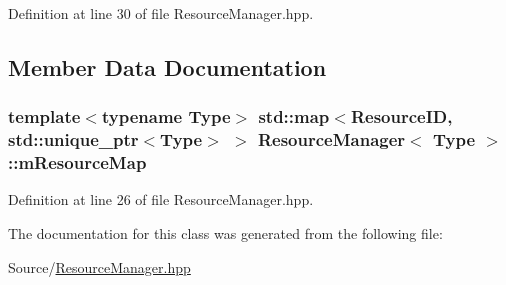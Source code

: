 Definition at line 30 of file Resource\-Manager.\-hpp.



\subsection{Member Data Documentation}
\hypertarget{class_resource_manager_af7f7accf221f620d9816ad3cfb80674e}{
\subsubsection[{m\-Resource\-Map}]{\setlength{\rightskip}{0pt plus 5cm}template$<$typename Type$>$ std\-::map$<${\bf Resource\-I\-D}, std\-::unique\-\_\-ptr$<$Type$>$ $>$ {\bf Resource\-Manager}$<$ Type $>$\-::m\-Resource\-Map\hspace{0.3cm}{\ttfamily [protected]}}}\label{class_resource_manager_af7f7accf221f620d9816ad3cfb80674e}


Definition at line 26 of file Resource\-Manager.\-hpp.



The documentation for this class was generated from the following file\-:\begin{DoxyCompactItemize}
\item 
Source/\hyperlink{_resource_manager_8hpp}{Resource\-Manager.\-hpp}\end{DoxyCompactItemize}
